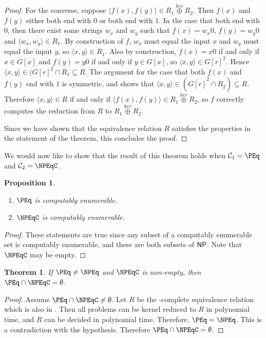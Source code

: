 \documentclass{article}
\newtheorem{theorem}{Theorem}[section]
\newtheorem{proposition}[proposition]{Proposition}
\theoremstyle{definition} \newtheorem{definition}[definition]{Definition}
\newcommand{\kj}{\overset{ker}{\oplus}} %
\newcommand{\pair}[2]{\langle#1,#2\rangle} %
\begin{document}
\begin{proof}
  For the converse, suppose $\pair{f(x)}{f(y)}\in R_1\kj R_2$.
  Then $f(x)$ and $f(y)$ either both end with $0$ or both end with $1$.
  In the case that both end with $0$, then there exist some strings $w_x$ and $w_y$ such that $f(x)=w_x0$, $f(y)=w_y0$ and $\pair{w_x}{w_y}\in R_1$.
  By construction of $f$, $w_x$ must equal the input $x$ and $w_y$ must equal the input $y$, so $\pair{x}{y}\in R_1$.
  Also by construction, $f(x)=x0$ if and only if $x\in G[x]$ and $f(y)=y0$ if and only if $y\in G[x]$, so $\pair{x}{y}\in{G[r]}^2$.
  Hence $\pair{x}{y}\in({G[r]}^2\cap R_1\subseteq R$.
  The argument for the case that both $f(x)$ and $f(y)$ end with $1$ is symmetric, and shows that $\pair{x}{y}\in(\overline{G[r]}^2\cap R_2)\subseteq R$.
  Therefore $\pair{x}{y}\in R$ if and only if $\pair{f(x)}{f(y)}\in R_1\kj R_2$, so $f$ correctly computes the reduction from $R$ to $R_1\kj R_2$.

  Since we have shown that the equivalence relation $R$ satisfies the properties in the statement of the theorem, this concludes the proof.
\end{proof}

We would now like to show that the result of this theorem holds when $\mathcal{C}_1=\PEq$ and $\mathcal{C}_2=\NPEqC$.

\begin{proposition}
  \mbox{} %
  \begin{enumerate}
  \item $\PEq$ is computably enumerable.
  \item $\NPEqC$ is computably enumerable.
  \end{enumerate}
\end{proposition}
\begin{proof}
  These statements are true since any subset of a computably enumerable set is computably enumerable, and these are both subsets of ${\mathsf{NP}}$.
  Note that $\NPEqC$ may be empty.
\end{proof}

\begin{theorem}\label{thm:npeqc}
  If $\PEq\neq\NPEq$ and $\NPEqC$ is non-empty, then $\PEq\cap\NPEqC=\emptyset$.
\end{theorem}
\begin{proof}
  Assume $\PEq\cap\NPEqC\neq\emptyset$.
  Let $R$ be the \NPEq-complete equivalence relation which is also in \PEq.
  Then all problems can be kernel reduced to $R$ in polynomial time, and $R$ can be decided in polynomial time.
  Therefore, $\PEq=\NPEq$.
  This is a contradiction with the hypothesis.
  Therefore $\PEq\cap\NPEqC=\emptyset$.
\end{proof}
\end{document}
